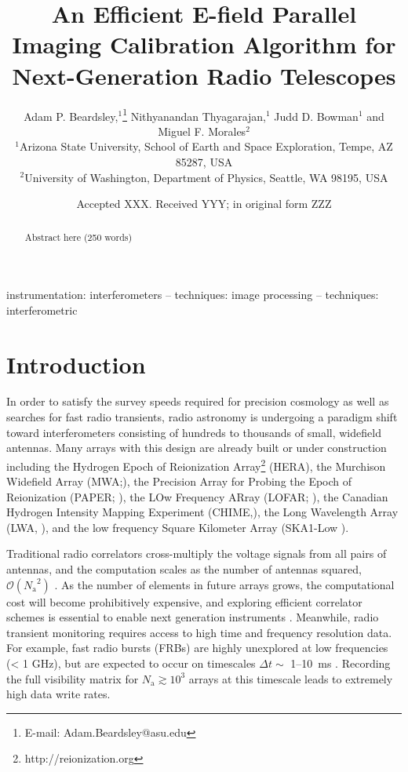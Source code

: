 \documentclass[a4paper,fleqn,usenatbib]{../mnras}
\title[E-field Parallel Imaging Calibration]{An Efficient E-field Parallel Imaging Calibration Algorithm for Next-Generation Radio Telescopes}
\author[Beardsley et al.]{
Adam P. Beardsley,$^{1}$\thanks{E-mail: Adam.Beardsley@asu.edu}
Nithyanandan Thyagarajan,$^{1}$
Judd D. Bowman$^{1}$
\newauthor
and Miguel F. Morales$^{2}$
\\
$^{1}$Arizona State University, School of Earth and Space Exploration, Tempe, AZ 85287, USA\\
$^{2}$University of Washington, Department of Physics, Seattle, WA 98195, USA\\
}
\date{Accepted XXX. Received YYY; in original form ZZZ}
\newcommand{\Nant}{\ensuremath{N_{\mathrm{a}}}}
\begin{document}
\label{firstpage}
\pagerange{\pageref{firstpage}--\pageref{lastpage}}
\maketitle

\begin{abstract}
Abstract here (250 words)
\end{abstract}

\begin{keywords}
instrumentation: interferometers -- techniques: image processing -- techniques: interferometric
\end{keywords}



\section{Introduction}
In order to satisfy the survey speeds required for precision cosmology as well as searches for fast radio transients, radio astronomy is undergoing a paradigm shift toward interferometers consisting of hundreds to thousands of small, widefield antennas. Many arrays with this design are already built or under construction including the Hydrogen Epoch of Reionization Array\footnote{http://reionization.org} (HERA), the Murchison Widefield Array (MWA;\citealt{tin13,bow13}), the Precision Array for Probing the Epoch of Reionization (PAPER; \citealt{par10}), the LOw Frequency ARray (LOFAR; \citealt{van13}), the Canadian Hydrogen Intensity Mapping Experiment (CHIME,\citealt{ban14}), the Long Wavelength Array (LWA, \citealt{ell13}), and the low frequency Square Kilometer Array (SKA1-Low \citealt{mel13}).

Traditional radio correlators cross-multiply the voltage signals from all pairs of antennas, and the computation scales as the number of antennas squared, $\mathcal{O}(\Nant^2)$ \citep{bun04}. As the number of elements in future arrays grows, the computational cost will become prohibitively expensive, and exploring efficient correlator schemes is essential to enable next generation instruments \citep{lon00}. Meanwhile, radio transient monitoring requires access to high time and frequency resolution data. For example, fast radio bursts (FRBs) are highly unexplored at low frequencies (< 1 GHz), but are expected to occur on timescales $\Delta t \sim$ 1--10~ms \citep{tho13}. Recording the full visibility matrix for $\Nant \gtrsim 10^3$ arrays at this timescale leads to extremely high data write rates. 
\end{document}
